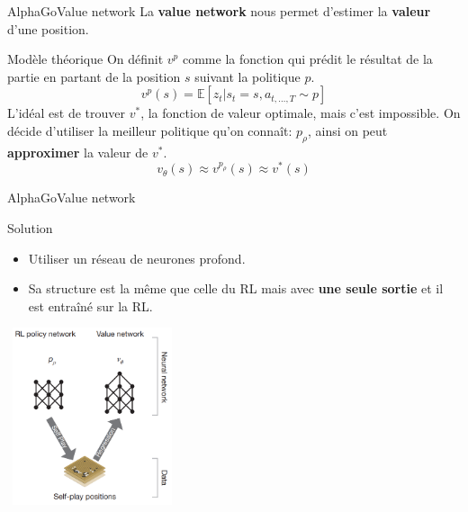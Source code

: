 \begin{frame}{AlphaGo}{Value network}
    La \textbf{value network} nous permet d'estimer la \textbf{valeur} d'une position.
    \begin{block}{Modèle théorique}
        On définit $v^p$ comme la fonction qui prédit le résultat de la partie en partant de la position $s$ suivant la politique $p$.$$v^p(s) = \mathbb{E}[z_t|s_t=s, a_{t,\dots,T}\sim p]$$
        L'idéal est de trouver $v^*$, la fonction de valeur optimale, mais c'est impossible.
        On décide d'utiliser la meilleur politique qu'on connaît: $p_\rho$, ainsi on peut \textbf{approximer} la valeur de $v^*$. $$v_\theta(s) \approx v^{p_\rho}(s) \approx v^*(s)$$
    \end{block}
\end{frame}

\begin{frame}{AlphaGo}{Value network}
    \begin{block}{Solution}
        \begin{itemize}
            \item Utiliser un réseau de neurones profond.
            \item Sa structure est la même que celle du RL mais avec \textbf{une seule sortie} et il est entraîné sur la RL.
        \end{itemize}
    \end{block}
    \begin{center}
        \includegraphics[width=5cm, height=5.2cm]{ressources/AlphaGo/RL_and_VN}
    \end{center}
\end{frame}

